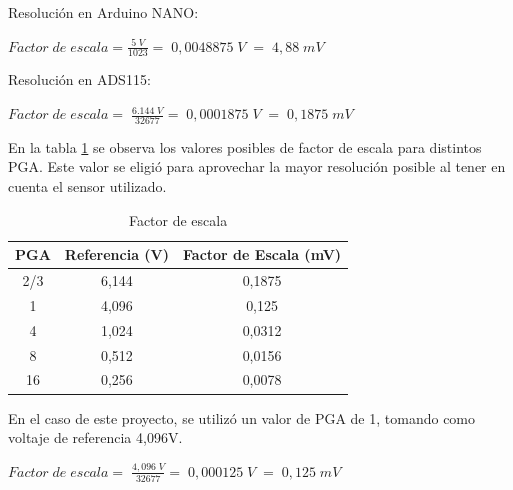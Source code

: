 Resolución en Arduino NANO:
\begin{center}
	\begin{math}Factor\;de\;escala=\frac{5\;V}{1023}=\;0,0048875\;V\;=\;4,88\;mV
	\end{math}
\end{center}

Resolución en ADS115:
\begin{center}
	\begin{math}Factor\;de\;escala=\;\frac{6.144\;V}{32677}=\;0,0001875\;V\;=\;0,1875\;mV
	\end{math}
\end{center}

En la tabla \ref{tab:Reso} se observa los valores posibles de factor de escala para distintos PGA. Este valor se eligió para aprovechar la mayor resolución posible al tener en cuenta el sensor utilizado.
\begin{table}[h]
	\centering
	\begin{tabular}{|c|c|c|}
		\hline
		\textbf{PGA} & \textbf{Referencia (V)} & \textbf{Factor de Escala (mV)} \\ \hline
		2/3          & 6,144                   & 0,1875                         \\ \hline
		1            & 4,096                   & 0,125                          \\ \hline
		4            & 1,024                   & 0,0312                         \\ \hline
		8            & 0,512                   & 0,0156                         \\ \hline
		16           & 0,256                   & 0,0078                         \\ \hline
	\end{tabular}
\caption{Factor de escala}
\label{tab:Reso}
\end{table}

En el caso de este proyecto, se utilizó un valor de PGA de 1, tomando como voltaje de referencia 4,096V.
\begin{center}
	\begin{math}
		Factor\;de\;escala=\;\frac{4,096\;V}{32677}=\;0,000125\;V\;=\;0,125\;mV
	\end{math}
\end{center}


